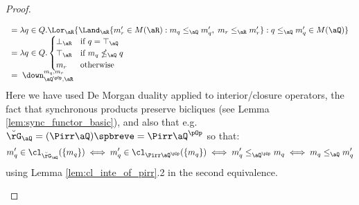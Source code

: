 \documentclass{article}
\begin{document}
\begin{proof}
\begin{enumerate}
\begin{enumerate}
\[\begin{tabular}{lll}
$= \lambda q \in Q. \Lor_\aR \{ \Land_\aR \{ m'_r \in M(\aR) : m_q \leq_\aQ m'_q, \; m_r \leq_\aR m'_r \} : q \leq_\aQ m'_q \in M(\aQ) \}$
\\
$= \lambda q \in Q.
\begin{cases}
\bot_\aR & \text{if $q = \top_\aQ$}
\\
\top_\aR & \text{if $m_q \nleq_\aQ q$}
\\
m_r & \text{otherwise}
\end{cases}$
\\
$= \; \down_{\aQ^{\pOp},\aR}^{m_q,m_r}$
\end{tabular}
\]
Here we have used De Morgan duality applied to interior/closure operators, the fact that synchronous products preserve bicliques (see Lemma \ref{lem:sync_functor_basic}), and also that e.g.\ $\breve{\rG}_\aQ = (\Pirr\aQ)\spbreve = \Pirr\aQ^{\pOp}$ so that:
\[
m'_q \in \cl_{\breve{\rG}_\aQ}(\{ m_q \})
\iff
m'_q \in \cl_{\Pirr\aQ^{\pOp}}(\{ m_q \})
\iff 
m'_q \leq_{\aQ^{\pOp}} m_q
\iff 
m_q \leq_\aQ m'_q
\]
using Lemma \ref{lem:cl_inte_of_pirr}.2 in the second equivalence.
\end{enumerate}





\end{enumerate}
\end{proof}
\end{document}
